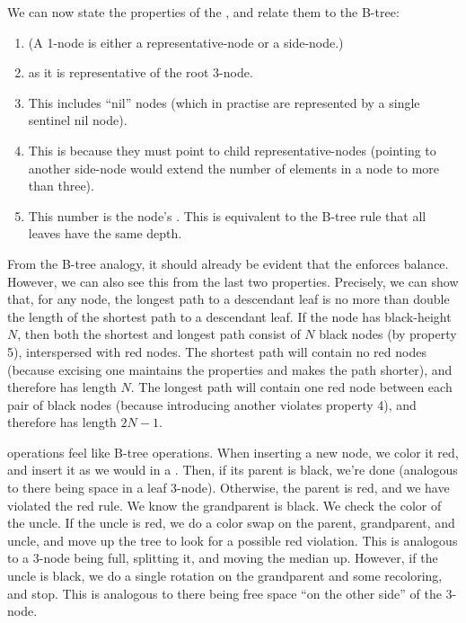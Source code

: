 We can now state the properties of the \RBt,
  and relate them to the B-tree:

\begin{enumerate}

\item
{}
(A 1-node is either a representative-node or a side-node.)

\item
{}
as it is representative of the root 3-node.

\item
{}
This includes \enquote{nil} nodes
  (which in practise are represented by a single sentinel nil node).

\item
{}
This is because they must point to child representative-nodes
  (pointing to another side-node would
  extend the number of elements in a node to more than three).

\item
{}
This number is the node's .
This is equivalent to the B-tree rule that all leaves have the same depth.

\end{enumerate}

From the B-tree analogy,
  it should already be evident that the \RBt enforces balance.
However, we can also see this from the last two \RBt properties.
Precisely, we can show that,
  for any node, the longest path to a descendant leaf
  is no more than double the length of the shortest path to a descendant leaf.
If the node has black-height $N$,
  then both the shortest and longest path consist of $N$ black nodes (by property 5), interspersed with red nodes.
The shortest path will contain no red nodes
  (because excising one maintains the \RBt properties and makes the path shorter),
  and therefore has length $N$.
The longest path will contain one red node between each pair of black nodes
  (because introducing another violates property 4),
  and therefore has length $2N-1$.

\RBt operations feel like B-tree operations.
When inserting a new node, we color it red,
  and insert it as we would in a \BST.
Then, if its parent is black, we're done
  (analogous to there being space in a leaf 3-node).
Otherwise, the parent is red, and we have violated the red rule.
We know the grandparent is black.
We check the color of the uncle.
If the uncle is red, we do a color swap on the parent, grandparent, and uncle,
  and move up the tree to look for a possible red violation.
This is analogous to a 3-node being full, splitting it, and moving the median up.
However, if the uncle is black,
  we do a single rotation on the grandparent and some recoloring, and stop.
This is analogous to there being free space \enquote{on the other side} of the 3-node.



